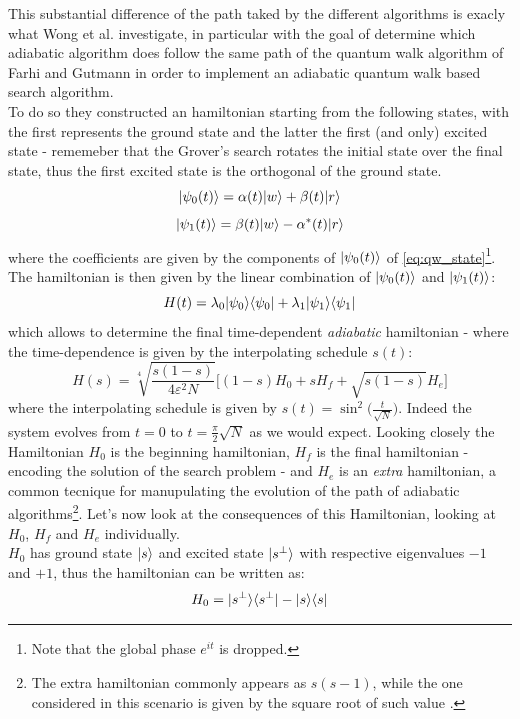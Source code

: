 \noindent
This substantial difference of the path taked by the different algorithms is exacly what Wong et al. investigate, in particular with the goal of determine which adiabatic algorithm does follow the same path of the quantum walk algorithm of Farhi and Gutmann in order to implement an adiabatic quantum walk based search algorithm. \\

\noindent
To do so they constructed an hamiltonian starting from the following states, with the first represents the ground state and the latter the first (and only) excited state - rememeber that the Grover's search rotates the initial state over the final state, thus the first excited state is the orthogonal of the ground state.
\begin{equation}
  {|{\psi_0(t)}\rangle} = \alpha(t){|{w}\rangle} + \beta(t){|{r}\rangle}
\end{equation}
\vspace{-0.5cm}
\begin{equation}
  {|{\psi_1(t)}\rangle} = \beta(t){|{w}\rangle} - \alpha^*(t){|{r}\rangle}
\end{equation}
where the coefficients are given by the components of ${|{\psi_0(t)}\rangle}$ of \cref{eq:qw_state}\footnote{Note that the global phase $e^{it}$ is dropped.}.
The hamiltonian is then given by the linear combination of ${|{\psi_0(t)}\rangle}$ and ${|{\psi_1(t)}\rangle}$:
\begin{equation}
  H(t) = \lambda_0{|{\psi_0}\rangle}{\langle{\psi_0}|} + \lambda_1{|{\psi_1}\rangle}{\langle{\psi_1}|}
\end{equation}
which allows to determine the final time-dependent \textit{adiabatic} hamiltonian - where the time-dependence is given by the interpolating schedule $s(t)$:
\begin{equation}
  H(s) = \sqrt[4]{\frac{s(1-s)}{4\varepsilon^2N}}\Big[ (1-s)H_0 + sH_f + \sqrt{s(1-s)}H_e\Big]
\end{equation}
where the interpolating schedule is given by $s(t)=\sin^2\big(\frac{t}{\sqrt{N}}\big)$. Indeed the system evolves from $t=0$ to $t=\frac{\pi}{2}\sqrt{N}$ as we would expect. Looking closely the Hamiltonian $H_0$ is the beginning hamiltonian, $H_f$ is the final hamiltonian - encoding the solution of the search problem - and $H_e$ is an \textit{extra} hamiltonian, a common tecnique for manupulating the evolution of the path of adiabatic algorithms\footnote{The extra hamiltonian commonly appears as $s(s-1)$, while the one considered in this scenario is given by the square root of such value \cite{Wong2016}.}. Let's now look at the consequences of this Hamiltonian, looking at $H_0$, $H_f$ and $H_e$ individually. \\
$H_0$ has ground state ${|{s}\rangle}$ and excited state ${|{s^\perp}\rangle}$ with respective eigenvalues $-1$ and $+1$, thus the hamiltonian can be written as:
\begin{equation}
  H_0  = {|{s^\perp}\rangle}{\langle{s^\perp}|} - {|{s}\rangle}{\langle{s}|}
\end{equation}
